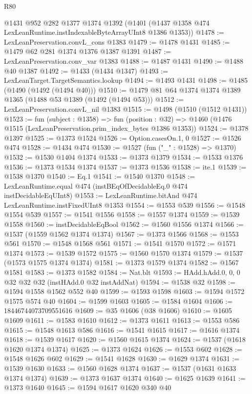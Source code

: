 \begin{lexlean}{R80}
\begin{coremodule}
    @1431
    @952
    @282
    @1377
    @1374
    @1392
    (@1401 (@1437 @1358 @474 LexLeanRuntime.instIndexableByteArrayUInt8 @1386 @1353))
@1478 := LexLeanPreservation.convL_cons @1383
@1479 := @1478 @1431
@1485 := @1479 @62 @281 @1374 @1376 @1387 @1391
@1487 := LexLeanPreservation.conv_var @1383
@1488 := @1487 @1431
@1490 := @1488 @40 @1387
@1492 := @1433 (@1434 @1347)
@1493 := LexLeanTarget.TargetSemantics.lookup
@1494 := @1493 @1431
@1498 := @1485 (@1490 (@1492 (@1494 @40)))
@1510 := @1479 @81 @64 @1374 @1374 @1389 @1365 (@1488 @53 @1389 (@1492 (@1494 @53)))
@1512 := LexLeanPreservation.convL_nil @1383
@1515 := @1498 (@1510 (@1512 @1431))
@1523 := fun (subject : @1358) =>
  fun (position : @32) => @1460 (@1476 @1515 (LexLeanPreservation.prim_index_bytes @1386 @1353))
@1524 := @1378 @1397
@1525 := @1373 @1524
@1526 := Option.casesOn.{1, 0}
@1527 := @1526 @474
@1528 := @1434 @474
@1530 := @1527 (fun ("_" : @1528) => @1370)
@1532 := @1530 @1404 @1374
@1533 := @1373 @1379
@1534 := @1533 @1376
@1536 := @1373 @1534 @1374
@1537 := @1373 @1536
@1538 := ite.{1}
@1539 := @1538 @1370
@1540 := Eq.{1}
@1541 := @1540 @1370
@1548 := LexLeanRuntime.equal @474 (instBEqOfDecidableEq.{0} @474 instDecidableEqUInt8)
@1553 := LexLeanRuntime.bitAnd @474 LexLeanRuntime.instFixedUInt8 @1353
@1554 := @1553 @539
@1556 := @1548 @1554 @539
@1557 := @1541 @1556
@1558 := @1557 @1374
@1559 := @1539 @1558
@1560 := instDecidableEqBool
@1562 := @1560 @1556 @1374
@1566 := @1537 (@1559 @1562 @1374 @1374)
@1567 := @1373 @1566
@1568 := @1553 @561
@1570 := @1548 @1568 @561
@1571 := @1541 @1570
@1572 := @1571 @1374
@1573 := @1539 @1572
@1575 := @1560 @1570 @1374
@1579 := @1537 (@1573 @1575 @1374 @1374)
@1581 := @1373 @1579 @1374
@1582 := @1567 @1581
@1583 := @1373 @1582
@1584 := Nat.blt
@1593 := HAdd.hAdd.{0, 0, 0} @32 @32 @32 (instHAdd.{0} @32 instAddNat)
@1594 := @1538 @32
@1598 := @1594 @1558 @1562 @552 @40
@1599 := @1593 @1598
@1603 := @1594 @1572 @1575 @574 @40
@1604 := @1599 @1603
@1605 := @1584 @1604
@1606 := 18446744073709551616
@1609 := @35 @1606 (@38 @1606)
@1610 := @1605 @1609
@1611 := @1583 @1610
@1612 := @1373 @1611
@1613 := @1553 @586
@1615 := @1548 @1613 @586
@1616 := @1541 @1615
@1617 := @1616 @1374
@1618 := @1539 @1617
@1620 := @1560 @1615 @1374
@1624 := @1537 (@1618 @1620 @1374 @1374)
@1625 := @1373 @1624
@1626 := @1553 @602
@1628 := @1548 @1626 @602
@1629 := @1541 @1628
@1630 := @1629 @1374
@1631 := @1539 @1630
@1633 := @1560 @1628 @1374
@1637 := @1537 (@1631 @1633 @1374 @1374)
@1639 := @1373 @1637 @1374
@1640 := @1625 @1639
@1641 := @1373 @1640
@1645 := @1594 @1617 @1620 @340 @40

\end{coremodule}
\end{lexlean}
